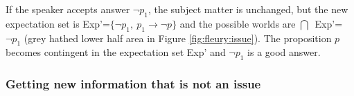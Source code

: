 \documentclass[output=paper,colorlinks,citecolor=brown,
]{langscibook}
\begin{document}
If the speaker accepts answer $\neg p_1$, the subject matter is unchanged,
but the new expectation set is
Exp'=$\{\neg p_1,~p_1\rightarrow{}\neg p\}$
and the possible worlds are
\mbox{$\bigcap$ Exp'=} $\neg p_1$
(grey hathed lower half area in Figure \ref{fig:fleury:issue}).
The proposition $p$ becomes contingent in the expectation set Exp' and
$\neg p_1$
is a good answer.



\subsubsection{Getting new information that is not an issue}
\end{document}

